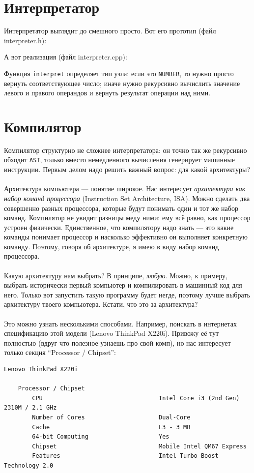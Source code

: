 \documentclass[11pt]{book}
\begin{document}
\section{Интерпретатор}
Интерпретатор выглядит до смешного просто. Вот его прототип (файл interpreter.h):

А вот реализация (файл interpreter.cpp):

Функция \texttt{interpret} определяет тип узла: если это \texttt{NUMBER},
то нужно просто вернуть соответствующее число; иначе нужно рекурсивно вычислить
значение левого и правого операндов и вернуть результат операции над ними.

\section{Компилятор}
Компилятор структурно не сложнее интерпретатора: он точно так же рекурсивно обходит
\texttt{AST}, только вместо немедленного вычисления генерирует машинные инструкции.
Первым делом надо решить важный вопрос: для какой архитектуры?
\\ \\
Архитектура компьютера --- понятие широкое. Нас интересует \emph{архитектура как набор команд процессора} 
(Instruction Set Architecture, ISA). Можно сделать два совершенно
разных процессора, которые будут понимать один и тот же набор команд. Компилятор не увидит
разницы меду ними: ему всё равно, как процессор устроен физически.
Единственное, что компилятору надо знать --- это какие команды понимает процессор
и насколько эффективно он выполняет конкретную команду. Поэтому, говоря об
архитектуре, я имею в виду набор команд процессора.
\\ \\
Какую архитектуру нам выбрать? В принципе, \emph{любую}. Можно, к примеру, выбрать
исторически первый компьютер и компилировать в машинный код для него. 
Только вот запустить такую программу будет негде, поэтому лучше выбрать 
архитектуру твоего компьютера. Кстати, что это за архитектура?
\\ \\
Это можно узнать несколькими способами. Например, поискать в интернетах спецификацию
этой модели (Lenovo ThinkPad X220i). Привожу её тут полностью (вдруг что полезное узнаешь про свой комп),
но нас интересует только секция ``Processor / Chipset'':

\begin{scriptsize}
\begin{verbatim}
Lenovo ThinkPad X220i

    Processor / Chipset
        CPU                                 Intel Core i3 (2nd Gen) 2310M / 2.1 GHz
        Number of Cores                     Dual-Core
        Cache                               L3 - 3 MB
        64-bit Computing                    Yes
        Chipset                             Mobile Intel QM67 Express
        Features                            Intel Turbo Boost Technology 2.0
\end{verbatim}
\end{scriptsize}
\end{document}
